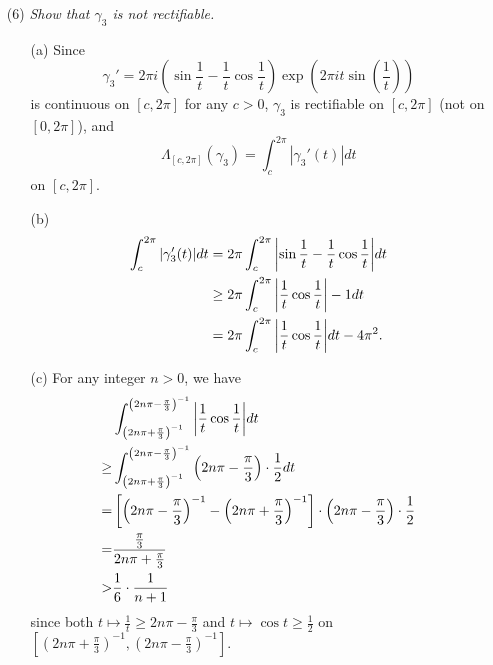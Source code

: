 \documentclass{article}
\begin{document}
\begin{enumerate}
  \item[(6)]
  \emph{Show that $\gamma_3$ is not rectifiable.}
  \begin{enumerate}
    \item[(a)]
    Since
    \[
      \gamma_3'
      = 2\pi i \left(\sin\frac{1}{t} - \frac{1}{t}\cos\frac{1}{t} \right)
        \exp(2\pi it \sin(\frac{1}{t}))
    \]
    is continuous on $[c,2\pi]$ for any $c > 0$,
    $\gamma_3$ is rectifiable on $[c,2\pi]$ (not on $[0,2\pi]$),
    and
    \[
      \Lambda_{[c,2\pi]}(\gamma_3)
      = \int_{c}^{2\pi} |\gamma_3'(t)| dt
    \]
    on $[c,2\pi]$.

    \item[(b)]
    \begin{align*}
      \int_{c}^{2\pi} |\gamma_3'(t)| dt
      &= 2\pi \int_{c}^{2\pi} \abs{\sin\frac{1}{t} - \frac{1}{t}\cos\frac{1}{t}} dt \\
      &\geq 2\pi \int_{c}^{2\pi} \abs{\frac{1}{t}\cos\frac{1}{t}} - 1 dt \\
      &= 2\pi \int_{c}^{2\pi} \abs{\frac{1}{t}\cos\frac{1}{t}} dt - 4\pi^2.
    \end{align*}

    \item[(c)]
    For any integer $n > 0$, we have
    \begin{align*}
      &\int_{\left(2n\pi + \frac{\pi}{3}\right)^{-1}}^{\left(2n\pi - \frac{\pi}{3}\right)^{-1}}
        \abs{\frac{1}{t}\cos\frac{1}{t}} dt \\
      \geq&
      \int_{\left(2n\pi + \frac{\pi}{3}\right)^{-1}}^{\left(2n\pi - \frac{\pi}{3}\right)^{-1}}
         \left(2n\pi - \frac{\pi}{3}\right) \cdot \frac{1}{2} dt \\
      =&
      \left[ \left(2n\pi - \frac{\pi}{3}\right)^{-1}
        - \left(2n\pi + \frac{\pi}{3}\right)^{-1} \right]
        \cdot \left(2n\pi - \frac{\pi}{3}\right) \cdot \frac{1}{2} \\
      =&
      \frac{\frac{\pi}{3}}{2n\pi + \frac{\pi}{3}} \\
      >&
      \frac{1}{6} \cdot \frac{1}{n+1}
    \end{align*}
    since both
    $t \mapsto \frac{1}{t} \geq 2n\pi - \frac{\pi}{3}$
    and
    $t \mapsto \cos t \geq \frac{1}{2}$ on
    $\left[\left(2n\pi + \frac{\pi}{3}\right)^{-1}, \left(2n\pi - \frac{\pi}{3}\right)^{-1} \right]$.


\end{enumerate}
\end{enumerate}
\end{document}
